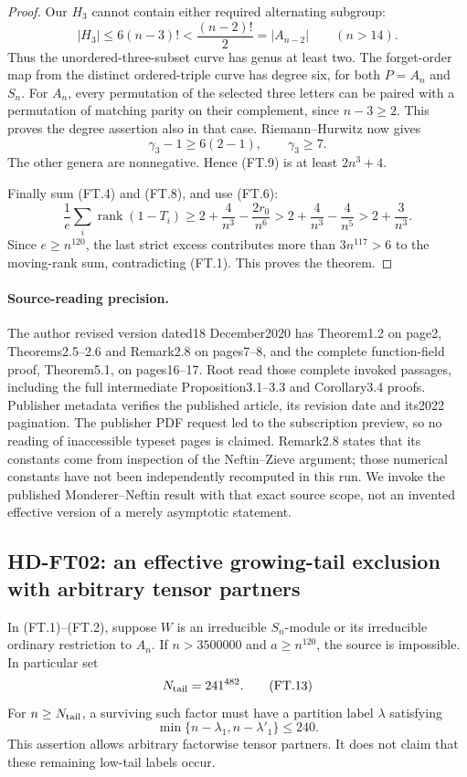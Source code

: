 \begin{proof}
Our \(H_3\) cannot contain either required alternating subgroup:
\[
 |H_3|\le6(n-3)!<
           \frac{(n-2)!}{2}=|A_{n-2}|
           \qquad(n>14).
 \tag{FT.10}
\]
Thus the unordered-three-subset curve has genus at least two.
The forget-order map from the distinct ordered-triple curve has
degree six, for both \(P=A_n\) and \(S_n\).
For \(A_n\), every permutation of the selected three letters
can be paired with a permutation of matching parity on their
complement, since \(n-3\ge2\). This proves the degree assertion
also in that case.
Riemann--Hurwitz now gives
\[
                  \gamma_3-1\ge6(2-1),\qquad\gamma_3\ge7.
                  \tag{FT.11}
\]
The other genera are nonnegative. Hence (FT.9) is at least
\(2n^3+4\).

Finally sum (FT.4) and (FT.8), and use (FT.6):
\[
 \frac1e\sum_i\operatorname{rank}(1-T_i)
 \ge2+\frac4{n^3}-\frac{2r_0}{n^6}
 >2+\frac4{n^3}-\frac4{n^5}
 >2+\frac3{n^3}.
 \tag{FT.12}
\]
Since \(e\ge n^{120}\), the last strict excess contributes more
than \(3n^{117}>6\) to the moving-rank sum, contradicting (FT.1).
This proves the theorem.
\end{proof}

\paragraph{Source-reading precision.}
The author revised version dated18 December2020 has Theorem1.2 on
page2, Theorems2.5--2.6 and Remark2.8 on pages7--8, and the complete
function-field proof, Theorem5.1, on pages16--17.
Root read those complete invoked passages, including the full
intermediate Proposition3.1--3.3 and Corollary3.4 proofs.
Publisher metadata verifies the published article, its revision date
and its2022 pagination. The publisher PDF request led to the
subscription preview, so no reading of inaccessible typeset pages
is claimed. Remark2.8 states that its constants come from inspection
of the Neftin--Zieve argument; those numerical constants have not
been independently recomputed in this run.
We invoke the published Monderer--Neftin result with that exact
source scope, not an invented effective version of a merely
asymptotic statement.

\subsection{HD-FT02: an effective growing-tail exclusion with arbitrary tensor partners}

\begin{corollary}[HD-FT02]
In (FT.1)--(FT.2), suppose \(W\) is an irreducible \(S_n\)-module
or its irreducible ordinary restriction to \(A_n\).
If \(n>3500000\) and \(a\ge n^{120}\), the source is impossible.
In particular set
\[
                         N_{\rm tail}=241^{482}.
                         \tag{FT.13}
\]
For \(n\ge N_{\rm tail}\), a surviving such factor must have a
partition label \(\lambda\) satisfying
\[
          \min\{n-\lambda_1,n-\lambda'_1\}\le240 .
          \tag{FT.14}
\]
This assertion allows arbitrary factorwise tensor partners.
It does not claim that these remaining low-tail labels occur.
\end{corollary}

